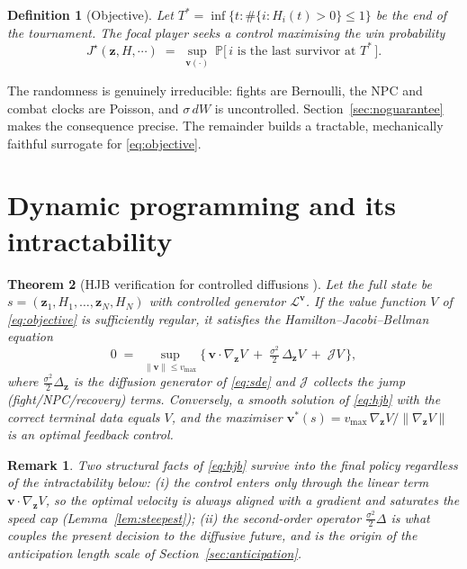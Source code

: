 \documentclass[11pt]{article}
\newtheorem{theorem}{Theorem}[section]
\newtheorem{definition}[theorem]{Definition}
\newtheorem*{remark}{Remark}
\newcommand{\Prob}{\mathbb{P}}
\newcommand{\vmax}{v_{\max}}
\newcommand{\z}{\mathbf{z}}
\newcommand{\vv}{\mathbf{v}}
\begin{document}
\begin{definition}[Objective]\label{def:obj}
Let $T^\ast=\inf\{t: \#\{i:H_i(t)>0\}\le 1\}$ be the end of the tournament. The
focal player seeks a control maximising the win probability
\begin{equation}\label{eq:objective}
  J^\star(\z,H,\cdots) \;=\; \sup_{\vv(\cdot)}\ \Prob\big[\,i \text{ is the last survivor at } T^\ast\,\big].
\end{equation}
\end{definition}

The randomness is genuinely irreducible: fights are Bernoulli, the NPC and
combat clocks are Poisson, and $\sigma\,dW$ is uncontrolled. Section~\ref{sec:noguarantee}
makes the consequence precise. The remainder builds a tractable, mechanically
faithful surrogate for \eqref{eq:objective}.

\newpage
\section{Dynamic programming and its intractability}

\begin{theorem}[HJB verification for controlled diffusions
{\cite[Ch.~III]{FlemingSoner}}]\label{thm:hjb}
Let the full state be $s=(\z_1,H_1,\dots,\z_N,H_N)$ with controlled generator
$\mathcal L^{\vv}$. If the value function $V$ of \eqref{eq:objective} is
sufficiently regular, it satisfies the Hamilton--Jacobi--Bellman equation
\begin{equation}\label{eq:hjb}
  0 \;=\; \sup_{\|\vv\|\le\vmax}\Big\{\, \vv\cdot\nabla_{\z}V
  \;+\; \tfrac{\sigma^2}{2}\,\Delta_{\z}V \;+\; \mathcal J V \,\Big\},
\end{equation}
where $\tfrac{\sigma^2}{2}\Delta_{\z}$ is the diffusion generator of
\eqref{eq:sde} and $\mathcal J$ collects the jump (fight/NPC/recovery) terms.
Conversely, a smooth solution of \eqref{eq:hjb} with the correct terminal data
equals $V$, and the maximiser $\vv^\ast(s)=\vmax\,\nabla_\z V/\|\nabla_\z V\|$ is
an optimal feedback control.
\end{theorem}

\begin{remark}
Two structural facts of \eqref{eq:hjb} survive into the final policy regardless
of the intractability below: (i) the control enters \emph{only} through the
linear term $\vv\cdot\nabla_\z V$, so the optimal velocity is always aligned
with a gradient and saturates the speed cap (Lemma~\ref{lem:steepest}); (ii) the
second-order operator $\tfrac{\sigma^2}{2}\Delta$ is what couples the present
decision to the diffusive future, and is the origin of the anticipation length
scale of Section~\ref{sec:anticipation}.
\end{remark}
\end{document}

